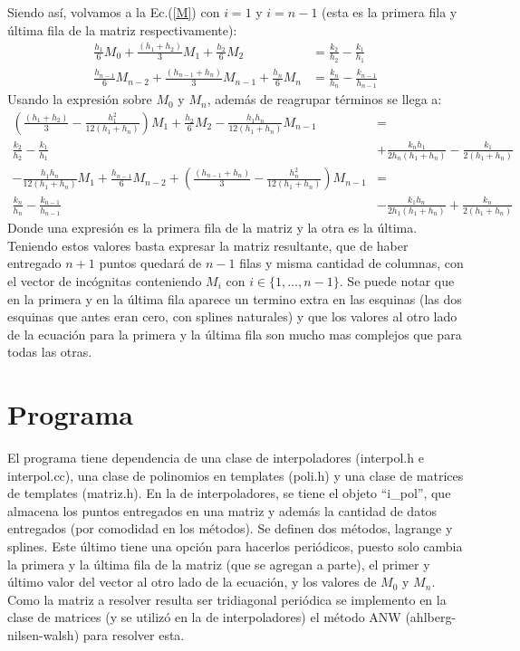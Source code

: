 \documentclass[12pt]{article}
\begin{document}
Siendo así, volvamos a la Ec.(\ref{M}) con $i=1$ y $i=n-1$ (esta es la primera fila y última fila de la matriz respectivamente):
\begin{align*}
\frac{h_1}{6}M_{0}+\frac{(h_1+h_{2})}{3}M_1+\frac{h_{2}}{6}M_{2}&=\frac{k_{2}}{h_{2}}-\frac{k_1}{h_1} \\
\frac{h_{n-1}}{6}M_{n-2}+\frac{(h_{n-1}+h_{n})}{3}M_{n-1}+\frac{h_{n}}{6}M_{n}&=\frac{k_{n}}{h_{n}}-\frac{k_{n-1}}{h_{n-1}}
\end{align*}
Usando la expresión sobre $M_0$ y $M_n$, además de reagrupar términos se llega a:
\begin{align*}
\left(\frac{(h_1+h_2)}{3}-\frac{h_1^2}{12(h_1+h_n)}\right)M_1+\frac{h_2}{6}M_2-\frac{h_1h_n}{12(h_1+h_n)}M_{n-1}&=\\ \frac{k_2}{h_2}-\frac{k_1}{h_1}&+\frac{k_nh_1}{2h_n(h_1+h_n)}-\frac{k_1}{2(h_1+h_n)}\\
-\frac{h_1h_n}{12(h_1+h_n)}M_{1}+\frac{h_{n-1}}{6}M_{n-2}+\left(\frac{(h_{n-1}+h_n)}{3}-\frac{h_n^2}{12(h_1+h_n)}\right)M_{n-1}&=\\ \frac{k_n}{h_n}-\frac{k_{n-1}}{h_{n-1}}&-\frac{k_1h_n}{2h_1(h_1+h_n)}+\frac{k_n}{2(h_1+h_n)}
\end{align*}
Donde una expresión es la primera fila de la matriz y la otra es la última. Teniendo estos valores basta expresar la matriz resultante, que de haber entregado $n+1$ puntos quedará de $n-1$ filas y misma cantidad de columnas, con el vector de incógnitas conteniendo $M_i$ con $i \in \{1,\dots ,n-1\}$. Se puede notar que en la primera y en la última fila aparece un termino extra en las esquinas (las dos esquinas que antes eran cero, con splines naturales) y que los valores al otro lado de la ecuación para la primera y la última fila son mucho mas complejos que para todas las otras.
\section{Programa}
El programa tiene dependencia de una clase de interpoladores (interpol.h e interpol.cc), una clase de polinomios en templates (poli.h) y una clase de matrices de templates (matriz.h). En la de interpoladores, se tiene el objeto ``i\_pol'', que almacena los puntos entregados en una matriz y  además la cantidad de datos entregados (por comodidad en los métodos). Se definen dos métodos, lagrange y splines. Este último tiene una opción para hacerlos periódicos, puesto solo cambia la primera y la última fila de la matriz (que se agregan a parte), el primer y último valor del vector al otro lado de la ecuación, y los valores de $M_0$ y $M_n$. Como la matriz a resolver resulta ser tridiagonal periódica se implemento en la clase de matrices (y se utilizó en la de interpoladores) el método ANW (ahlberg-nilsen-walsh) para resolver esta.
\end{document}
